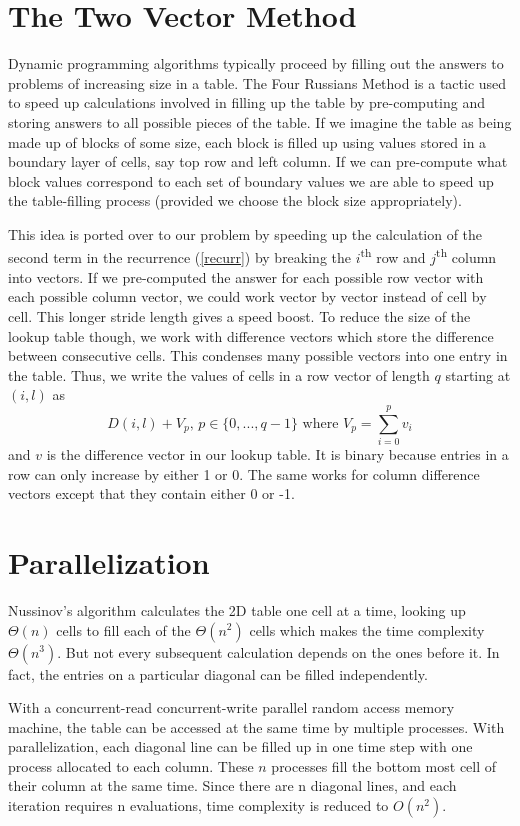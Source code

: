 \documentclass[11pt,a4paper]{article}
\begin{document}
\section{The Two Vector Method}

Dynamic programming algorithms typically proceed by filling out the answers to problems of increasing size in a table. The Four Russians Method is a tactic used to speed up calculations involved in filling up the table by pre-computing and storing answers to all possible pieces of the table. If we imagine the table as being made up of blocks of some size, each block is filled up using values stored in a boundary layer of cells, say top row and left column. If we can pre-compute what block values correspond to each set of boundary values we are able to speed up the table-filling process (provided we choose the block size appropriately).

This idea is ported over to our problem by speeding up the calculation of the second term in the recurrence (\ref{recurr}) by breaking the $i$\textsuperscript{th} row and $j$\textsuperscript{th} column into vectors. If we pre-computed the answer for each possible row vector with each possible column vector,  we could work vector by vector instead of cell by cell. This longer stride length gives a speed boost. To reduce the size of the lookup table though, we work with difference vectors which store the difference between consecutive cells. This condenses many possible vectors into one entry in the table. Thus, we write the values of cells in a row vector of length $q$ starting at $(i,l)$ as
\[
D(i,l) + V_p\text{, }p\in \lbrace 0,...,q-1\rbrace\text{ where }V_p = \sum\limits_{i=0}^p v_i
\]
and $v$ is the difference vector in our lookup table. It is binary because entries in a row can only increase by either 1 or 0. The same works for column difference vectors except that they contain either 0 or -1.

\section{Parallelization}
Nussinov's algorithm calculates the 2D table one cell at a time, looking up  $\Theta(n)$ cells to fill each of the $\Theta(n^2)$ cells which makes the time complexity $\Theta(n^3)$. But not every subsequent calculation depends on the ones before it. In fact, the entries on a particular diagonal can be filled independently.

With a concurrent-read concurrent-write parallel random access memory machine, the table can be accessed at the same time by multiple processes. With parallelization, each diagonal line can be filled up in one time step with one process allocated to each column. These $n$ processes fill the bottom most cell of their column at the same time. Since there are n diagonal lines, and each iteration requires n evaluations, time complexity is reduced to $O(n^2)$.
\end{document}
